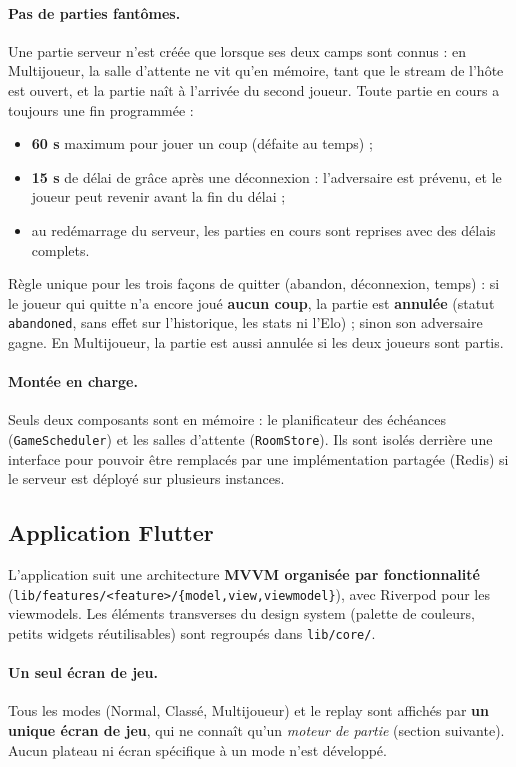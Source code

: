\documentclass[a4paper,11pt]{article}
\begin{document}
\paragraph{Pas de parties fantômes.} Une partie serveur n'est créée que lorsque ses
deux camps sont connus : en Multijoueur, la salle d'attente ne vit qu'en mémoire,
tant que le stream de l'hôte est ouvert, et la partie naît à l'arrivée du second
joueur. Toute partie en cours a toujours une fin programmée :
\begin{itemize}[leftmargin=1.5em]
  \item \textbf{60 s} maximum pour jouer un coup (défaite au temps) ;
  \item \textbf{15 s} de délai de grâce après une déconnexion : l'adversaire est
        prévenu, et le joueur peut revenir avant la fin du délai ;
  \item au redémarrage du serveur, les parties en cours sont reprises avec des délais
        complets.
\end{itemize}
Règle unique pour les trois façons de quitter (abandon, déconnexion, temps) : si le
joueur qui quitte n'a encore joué \textbf{aucun coup}, la partie est
\textbf{annulée} (statut \texttt{abandoned}, sans effet sur l'historique, les stats
ni l'Elo) ; sinon son adversaire gagne. En Multijoueur, la partie est aussi annulée
si les deux joueurs sont partis.

\paragraph{Montée en charge.} Seuls deux composants sont en mémoire : le planificateur
des échéances (\texttt{GameScheduler}) et les salles d'attente (\texttt{RoomStore}).
Ils sont isolés derrière une interface pour pouvoir être remplacés par une
implémentation partagée (Redis) si le serveur est déployé sur plusieurs instances.

\subsection{Application Flutter}
L'application suit une architecture \textbf{MVVM organisée par fonctionnalité}
(\texttt{lib/features/<feature>/\{model,view,viewmodel\}}), avec Riverpod pour les
viewmodels. Les éléments transverses du design system (palette de couleurs, petits
widgets réutilisables) sont regroupés dans \texttt{lib/core/}.

\paragraph{Un seul écran de jeu.} Tous les modes (Normal, Classé, Multijoueur) et le
replay sont affichés par \textbf{un unique écran de jeu}, qui ne connaît qu'un
\textit{moteur de partie} (section suivante). Aucun plateau ni écran spécifique à un
mode n'est développé.
\end{document}
